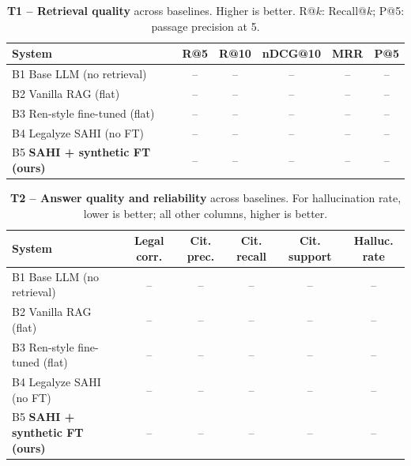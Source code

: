 \documentclass[10pt,twocolumn]{article}
\renewcommand{\arraystretch}{1.25}
\newcommand{\tbd}{\textcolor{black!45}{--}}
\begin{document}
\begin{table}[t]
\centering
\caption{\textbf{T1 -- Retrieval quality} across baselines. Higher is better. R@$k$: Recall@$k$;
P@5: passage precision at 5.}
\label{tab:rd-t1}
\footnotesize
\setlength{\tabcolsep}{6pt}
\renewcommand{\arraystretch}{1.3}
\begin{tabularx}{\textwidth}{>{\raggedright\arraybackslash}X ccccc}
\toprule
\textbf{System} & \textbf{R@5} & \textbf{R@10} & \textbf{nDCG@10} & \textbf{MRR} & \textbf{P@5} \\
\midrule
B1 Base LLM (no retrieval) & \tbd & \tbd & \tbd & \tbd & \tbd \\
B2 Vanilla RAG (flat) & \tbd & \tbd & \tbd & \tbd & \tbd \\
B3 Ren-style fine-tuned (flat) & \tbd & \tbd & \tbd & \tbd & \tbd \\
B4 Legalyze SAHI (no FT) & \tbd & \tbd & \tbd & \tbd & \tbd \\
B5 \textbf{SAHI + synthetic FT (ours)} & \tbd & \tbd & \tbd & \tbd & \tbd \\
\bottomrule
\end{tabularx}
\end{table}

\begin{table}[t]
\centering
\caption{\textbf{T2 -- Answer quality and reliability} across baselines. For hallucination rate, lower
is better; all other columns, higher is better.}
\label{tab:rd-t2}
\footnotesize
\setlength{\tabcolsep}{6pt}
\renewcommand{\arraystretch}{1.3}
\begin{tabularx}{\textwidth}{>{\raggedright\arraybackslash}X ccccc}
\toprule
\textbf{System} & \textbf{Legal corr.} & \textbf{Cit. prec.} & \textbf{Cit. recall} & \textbf{Cit. support} & \textbf{Halluc. rate} \\
\midrule
B1 Base LLM (no retrieval) & \tbd & \tbd & \tbd & \tbd & \tbd \\
B2 Vanilla RAG (flat) & \tbd & \tbd & \tbd & \tbd & \tbd \\
B3 Ren-style fine-tuned (flat) & \tbd & \tbd & \tbd & \tbd & \tbd \\
B4 Legalyze SAHI (no FT) & \tbd & \tbd & \tbd & \tbd & \tbd \\
B5 \textbf{SAHI + synthetic FT (ours)} & \tbd & \tbd & \tbd & \tbd & \tbd \\
\bottomrule
\end{tabularx}
\end{table}
\end{document}
